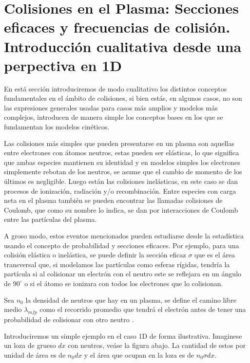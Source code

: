 \section{Colisiones en el Plasma: Secciones eficaces y frecuencias de colisi\'on. Introducci\'on cualitativa desde una perpectiva en 1D}

  En est\'a secci\'on introduciremos de modo cualitativo los distintos conceptos fundamentales en el \'ambito de colisiones, si bien est\'as, en algunos casos, no son las expresiones generales usadas para casos m\'as amplios y modelos m\'as complejos, introducen de manera simple los conceptos bases en los que se fundamentan los modelos cin\'eticos. 

  Las colisiones m\'as simples que pueden presentarse en un plasma son aquellas entre electrones con \'atomos neutros, estas pueden ser el\'asticas, lo que significa que ambas especies mantienen su identidad y en modelos simples los electrones simplemente rebotan de los neutros, se asume que el cambio de momento de los \'ultimos es negligible. Luego est\'an las colisiones inel\'asticas, en este caso se dan procesos de ionizaci\'on, radiaci\'on y/o recombinaci\'on. Entre especies con carga neta en el plasma tambi\'en se pueden encontrar las llamadas colisiones de Coulomb, que como su nombre lo indica, se dan por interacciones de Coulomb entre las part\'iculas del plasma. 

  A groso modo, estos eventos mencionados pueden estudiarse desde la estad\'istica usando el concepto de probabilidad y secciones eficaces. Por ejemplo, para una colisi\'on el\'astica o inel\'astica, se puede definir la secci\'on eficaz $\sigma$ que es el \'area transversal que, si modelamos las part\'iculas como esferas r\'igidas, tendr\'ia la part\'icula si al colisionar un electr\'on con el neutro este se reflejara en un \'angulo de $90^\circ$ o si el \'atomo se ionizara con todos los electrones que lo colisionan.

    Sea $n_0$ la densidad de neutros que hay en un plasma, se define el camino libre medio $\lambda_{mfp}$ como el recorrido promedio que tendr\'a el electr\'on antes de tener una probabilidad de colisionar con otro neutro \cite{goldston1995}. 

    Introduciremos un simple ejemplo en el caso 1D de forma ilustrativa. Imaginese un loza de grueso $dx$ con neutros, ve\'ase la figura abajo. La cantidad de estos por unidad de \'area es de $n_0dx$ y el \'area que ocupan en la loza es de $n_0 \sigma dx$. 

